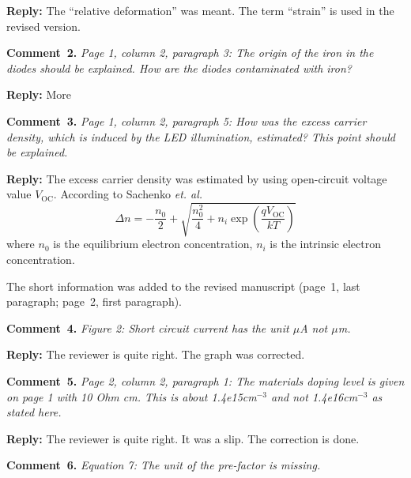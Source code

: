 \documentclass[aip,jap,preprint]{revtex4-1}
\begin{document}
\noindent
\textcolor[rgb]{0.51,0.00,0.00}{\textbf{Reply:}}
The ``relative deformation'' was meant.
The term ``strain'' is used in the revised version.


\vspace{1cm}
\noindent
\textcolor[rgb]{0.00,0.50,1.00}{\textbf{Comment~2.}}
\emph{Page 1, column 2, paragraph 3: The origin of the iron in the diodes should be explained. How are the diodes contaminated with iron? }

\noindent
\textcolor[rgb]{0.51,0.00,0.00}{\textbf{Reply:}}
More

\vspace{1cm}
\noindent
\textcolor[rgb]{0.00,0.50,1.00}{\textbf{Comment~3.}}
\emph{Page 1, column 2, paragraph 5: How was the excess carrier density, which is induced by the LED illumination, estimated? This point should be explained. }

\noindent
\textcolor[rgb]{0.51,0.00,0.00}{\textbf{Reply:}}
The excess carrier density was estimated by using open-circuit voltage value $V_\mathrm{OC}$.
According to Sachenko \emph{et. al.}\cite{JAPSach}
\begin{equation}
  \Delta n=-\frac{n_0}{2}+\sqrt{\frac{n_0^2}{4}+n_i\exp\left(\frac{qV_\mathrm{OC}}{kT}\right)}
\end{equation}
where
$n_0$ is the equilibrium electron concentration,
$n_i$ is the intrinsic electron concentration.

The short information was added to the revised manuscript (page~1, last paragraph; page~2, first paragraph).


\vspace{1cm}
\noindent
\textcolor[rgb]{0.00,0.50,1.00}{\textbf{Comment~4.}}
\emph{Figure 2: Short circuit current has the unit $\mu$A not $\mu$m.}

\noindent
\textcolor[rgb]{0.51,0.00,0.00}{\textbf{Reply:}}
The reviewer is quite right.
The graph was corrected.


\vspace{1cm}
\noindent
\textcolor[rgb]{0.00,0.50,1.00}{\textbf{Comment~5.}}
\emph{Page 2, column 2, paragraph 1: The materials doping level is given on page 1 with 10 Ohm cm. This is about 1.4e15cm$^{-3}$ and not 1.4e16cm$^{-3}$ as stated here.}

\noindent
\textcolor[rgb]{0.51,0.00,0.00}{\textbf{Reply:}}
The reviewer is quite right.
It was a slip.
The correction is done.


\vspace{1cm}
\noindent
\textcolor[rgb]{0.00,0.50,1.00}{\textbf{Comment~6.}}
\emph{Equation 7: The unit of the pre-factor is missing. }
\end{document}
